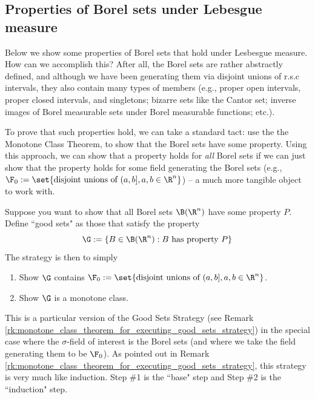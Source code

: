 \documentclass{article} %
\begin{document}
\subsection{Properties of Borel sets under Lebesgue measure} \label{sec:properties_of_borel_sets}

Below we show some properties of Borel sets that hold under Lesbesgue measure.  How can we accomplish this?  After all, the Borel sets are rather abstractly defined, and although we have been generating them via disjoint unions of r.s.c intervals, they also contain many types of members (e.g., proper open intervals, proper closed intervals, and singletons; bizarre sets like the Cantor set; inverse images of Borel measurable sets under Borel measurable functions; etc.).

To prove that such properties hold, we can take a standard tact: use the the Monotone Class Theorem,  to show that the Borel sets have some property.  Using this approach, we can show that a property holds for \textit{all} Borel sets if we can just show that the property holds for some field generating the Borel sets (e.g., $\F_0 := \set{\text{disjoint unions of } (a,b], a,b \in \R^n }$) -- a much more tangible object to work with.


\begin{remark}{}
Suppose you want to show that all Borel sets $\B(\R^n)$ have some property $P$.  Define ``good sets" as those that satisfy the property
\[ \G := \{ B \in \B(\R^n) : B \text{ has property } P \} \]
The strategy is then to simply
\begin{enumerate}
\item Show $\G$ contains $\F_0 := \set{\text{disjoint unions of } (a,b], a,b \in \R^n }$.
\item Show $\G$ is a monotone class.  
\end{enumerate}	 
\label{rk:monotone_class_theorem_for_executing_good_sets_strategy_with_borel_sets}
\end{remark}


This is a particular version of the Good Sets Strategy (see Remark \ref{rk:monotone_class_theorem_for_executing_good_sets_strategy}) in the special case where the $\sigma$-field of interest is the Borel sets (and where we take the field generating them to be $\F_0$).  As pointed out in Remark \ref{rk:monotone_class_theorem_for_executing_good_sets_strategy}, this strategy is very much like induction.  Step \#1 is the ``base" step and Step \#2 is the ``induction" step.
\end{document}
